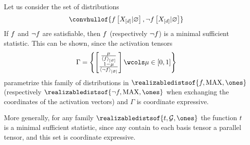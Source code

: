 \documentclass[aps,onecolumn,nofootinbib,pra]{article}
\begin{document}
    \begin{example}
        \label{exa:singleFormulaMinimalSstat}
        Let us consider the set of distributions
        \begin{align*}
            \convhullof{\exformulaat{\shortcatvariables|\varnothing},\lnot\exformulaat{\shortcatvariables|\varnothing}}
        \end{align*}
        If $f$ and $\lnot f$ are satisfiable, then $f$ (respectively $\lnot f$) is a minimal sufficient statistic.
        This can be shown, since the activation tensors
        \begin{align*}
            \Gamma = \left\{
                         \begin{bmatrix}
                             \frac{\mu}{\contraction{\exformula}} \\
                             \frac{1-\mu}{\contraction{\lnot\exformula}}
                         \end{bmatrix}
                         \wcols \mu\in[0,1] \right\}
        \end{align*}
        parametrize this family of distributions in $\realizabledistsof{\exformula,\maxgraph,\trivbm}$ (respectively $\realizabledistsof{\lnot\exformula,\maxgraph,\trivbm}$ when exchanging the coordinates of the activation vectors) and $\Gamma$ is coordinate expressive.
    \end{example}


    \begin{example}
        More generally, for any family $\realizabledistsof{\sstat,\graph,\trivbm}$ the function $t$ is a minimal sufficient statistic, since any contain to each basis tensor a parallel tensor, and this set is coordinate expressive.
    \end{example}
\end{document}
